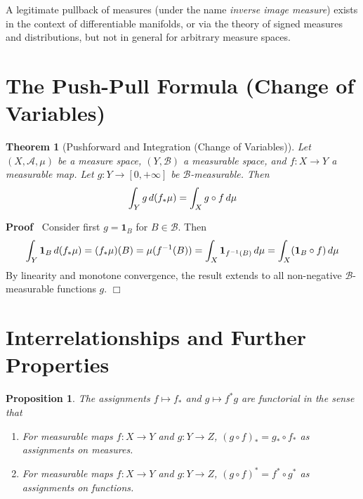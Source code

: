 \documentclass{article}
\newcommand{\tmem}[1]{{\em #1\/}}
\newenvironment{proof}{\noindent\textbf{Proof\ }}{\hspace*{\fill}$\Box$\medskip}
\newtheorem{proposition}{Proposition}
{\theorembodyfont{\rmfamily}\newtheorem{remark}{Remark}}
\newtheorem{theorem}{Theorem}
\begin{document}
\begin{remark}
  A legitimate pullback of measures (under the name {\tmem{inverse image
  measure}}) exists in the context of differentiable manifolds, or via the
  theory of signed measures and distributions, but not in general for
  arbitrary measure spaces.
\end{remark}

\section{The Push-Pull Formula (Change of Variables)}

\begin{theorem}
  [Pushforward and Integration (Change of Variables)] Let $(X, \mathcal{A},
  \mu)$ be a measure space, $(Y, \mathcal{B})$ a measurable space, and $f : X
  \to Y$ a measurable map. Let $g : Y \to [0, + \infty]$ be
  $\mathcal{B}$-measurable. Then
  \begin{equation}
    \int_Y g \hspace{0.17em} d (f_{\ast} \mu) = \int_X g \circ f
    \hspace{0.17em} d \mu
  \end{equation}
\end{theorem}

\begin{proof}
  Consider first $g = \textbf{1}_B$ for $B \in \mathcal{B}$. Then
  \begin{equation}
    \int_Y \textbf{1}_B  \hspace{0.17em} d (f_{\ast} \mu) = (f_{\ast} \mu) (B)
    = \mu (f^{- 1} (B)) = \int_X \textbf{1}_{f^{- 1} (B)}  \hspace{0.17em} d
    \mu = \int_X (\textbf{1}_B \circ f)  \hspace{0.17em} d \mu
  \end{equation}
  By linearity and monotone convergence, the result extends to all
  non-negative $\mathcal{B}$-measurable functions $g$.
\end{proof}

\section{Interrelationships and Further Properties}

\begin{proposition}
  The assignments $f \mapsto f_{\ast}$ and $g \mapsto f^{\ast} g$ are
  functorial in the sense that
  \begin{enumerate}
    \item For measurable maps $f : X \to Y$ and $g : Y \to Z$, $(g \circ
    f)_{\ast} = g_{\ast} \circ f_{\ast}$ as assignments on measures.
    
    \item For measurable maps $f : X \to Y$ and $g : Y \to Z$, $(g \circ
    f)^{\ast} = f^{\ast} \circ g^{\ast}$ as assignments on functions.
  \end{enumerate}
\end{proposition}
\end{document}
